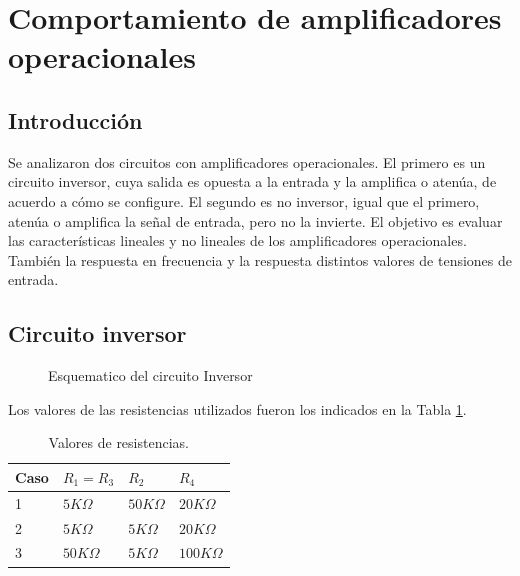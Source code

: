 \documentclass[../../main.tex]{subfiles}
\begin{document}
\section{Comportamiento de amplificadores operacionales}
\subsection{Introducci\'on}
Se analizaron dos circuitos con amplificadores operacionales. El primero es un circuito inversor, cuya salida es opuesta a la entrada y la amplifica o atenúa, de acuerdo a c\'omo se configure. El segundo es no inversor, igual que el primero, atenúa o amplifica la señal de entrada, pero no la invierte.
El objetivo es evaluar las características lineales y no lineales de los amplificadores operacionales. También la respuesta en frecuencia y la respuesta distintos valores de tensiones de entrada.



\subsection{Circuito inversor}



\begin{figure}[H]
\centering



\caption{Esquematico del circuito Inversor}
\end{figure}

Los valores de las resistencias utilizados fueron los indicados en la Tabla \ref{tab=vResistencias}.

\begin{table}[h]
\begin{center}
\begin{tabular}{|l|l|l|l|}
\hline
Caso & $R_{1}=R_{3}$ & $R_{2}$ & $R_{4}$\\
\hline \hline
1 & $5 K\Omega $ &  $50 K\Omega $ &  $20 K\Omega $ \\ \hline
2 & $5 K\Omega $ &  $5 K\Omega $ &  $20 K\Omega $ \\ \hline
3 & $50 K\Omega $ &  $5 K\Omega $ &  $100 K\Omega $ \\ \hline
\end{tabular}
\caption{Valores de resistencias.} 
\label{tab=vResistencias}
\end{center}
\end{table}
\end{document}
